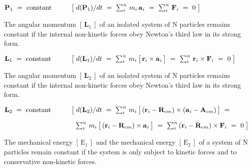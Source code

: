 \documentclass[10pt]{article}
\begin{document}
\par \bigskip\medskip ${\mathbf{P}}_1 ~=~ {\mathrm{constant}} \hspace{+2.88em} \big [ \; d({\mathbf{P}}_1)/dt ~=~ \sum_i^{\scriptscriptstyle{\mathrm{N}}} \, m_i \, {\mathbf{a}}_{\hspace{+0.045em}i} ~=~ \sum_i^{\scriptscriptstyle{\mathrm{N}}} \, {\mathbf{F}}_i ~=~ 0 \; \big ]$

\par \bigskip\medskip \noindent The angular momentum $[ \, {\mathbf{L}}_1 \, ]$ of an isolated system of N particles remains constant if the internal non-kinetic forces obey Newton's third law in its strong form.

\par \bigskip\medskip ${\mathbf{L}}_1 ~=~ {\mathrm{constant}} \hspace{+2.97em} \big [ \; d({\mathbf{L}}_1)/dt ~=~ \sum_i^{\scriptscriptstyle{\mathrm{N}}} \, m_i \, \big [ \, {\mathbf{r}}_i \times {\mathbf{a}}_{\hspace{+0.045em}i} \, \big ]~=~ \sum_i^{\scriptscriptstyle{\mathrm{N}}} \, {\mathbf{r}}_i \times {\mathbf{F}}_i ~=~ 0 \; \big ]$

\par \bigskip\medskip \noindent The angular momentum $[ \, {\mathbf{L}}_2 \, ]$ of an isolated system of N particles remains constant if the internal non-kinetic forces obey Newton's third law in its strong form.

\par \bigskip\medskip ${\mathbf{L}}_2 ~=~ {\mathrm{constant}} \hspace{+2.97em} \big [ \; d({\mathbf{L}}_2)/dt ~=~ \sum_i^{\scriptscriptstyle{\mathrm{N}}} \, m_i \, \big [ \, ({\mathbf{r}}_i - {\mathbf{R}}_{cm}) \times ({\mathbf{a}}_{\hspace{+0.045em}i} - {\mathbf{A}}_{cm}) \, \big ] ~=~$

\par \bigskip $\hspace{+10.44em} \sum_i^{\scriptscriptstyle{\mathrm{N}}} \, m_i \, \big [ \, ({\mathbf{r}}_i - {\mathbf{R}}_{cm}) \times {\mathbf{a}}_{\hspace{+0.045em}i} \, \big ] ~=~ \sum_i^{\scriptscriptstyle{\mathrm{N}}} \, ({\mathbf{r}}_i - {\mathbf{R}}_{cm}) \times {\mathbf{F}}_i ~=~ 0 \; \big ]$

\par \bigskip\medskip \noindent The mechanical energy $[ \, {\mathrm{E}}_1 \, ]$ and the mechanical energy $[ \, {\mathrm{E}}_2 \, ]$ of a system of N particles remain constant if the system is only subject to kinetic forces and to conservative non-kinetic forces.
\end{document}
